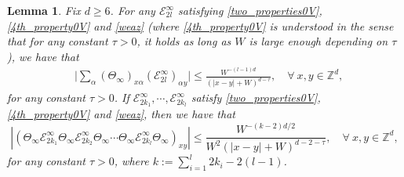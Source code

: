 \documentclass{article}
\newcommand{\1}{\mathds{1}}
\numberwithin{equation}{section}
\newcommand{\al}{\alpha}
\newcommand{\be}{\begin{equation}}
\newcommand{\ee}{\end{equation}}
\newcommand{\e}{{\varepsilon}}
\renewcommand{\cal}{\mathcal}
\newcommand{\ii}{\mathrm{i}} %
\renewcommand{\leq}{\leqslant}
\renewcommand{\geq}{\geqslant}
\renewcommand{\le}{\leq}
\renewcommand{\ge}{\geq}
\newcommand{\Z}{\mathbb{Z}}
\theoremstyle{plain} %
\newtheorem{lemma}[theorem]{Lemma}
\theoremstyle{remark}
\newcommand{\cob}{\color{purple}}
\newcommand{\Sinfty}{\Sigma^{\infty}}
\newcommand{\Sele}{{\mathcal E}}
\newcommand{\Selek}{{\mathcal E}}
\newcommand{\Seleinf}{{\mathcal E}^{\infty}}
\begin{document}
\begin{lemma}\label{lem redundantagain2}
Fix $d\ge 6$.  For any $\Seleinf_{2l}$ satisfying \eqref{two_properties0V}, \eqref{4th_property0V} and \eqref{weaz} (where \eqref{4th_property0V} is understood in the sense that for any constant $\tau>0$, it holds as long as $W$ is large enough depending on $\tau$), %
we have that
\begin{align}
&\Big| \sum_{\al}(\Theta_\infty)_{x \al} (\Seleinf_{2l} )_{\al y} \Big|\le \frac{W^{-(l-1)d}}{(|x-y|+W)^{d-\tau} },\quad \forall \ x,y \in \Z^d,  \label{redundant again2}
\end{align}
for any constant $\tau>0$. If $\Sele^{\infty}_{2k_1},  \cdots ,  \Sele^{\infty}_{2k_l} $ satisfy \eqref{two_properties0V}, \eqref{4th_property0V} and \eqref{weaz}, then we have that %
\be \label{BRB2} 
\left|\left(\Theta_\infty \Sele^{\infty}_{2k_1}\Theta_\infty  \Sele^{\infty}_{2k_2}\Theta_\infty \cdots \Theta_\infty  \Sele^{\infty}_{2k_l}\Theta_\infty\right)_{xy}\right|\le \frac{W^{-(k-2)d/2}}{W^2(|x-y|+W)^{d-2-\tau}} , \quad \forall \ x,y \in \Z^d,  \ee
 for any constant $\tau>0$, where $k:=\sum_{i=1}^l  2k_i -2(l-1)$. 
 \end{lemma}
\end{document}
